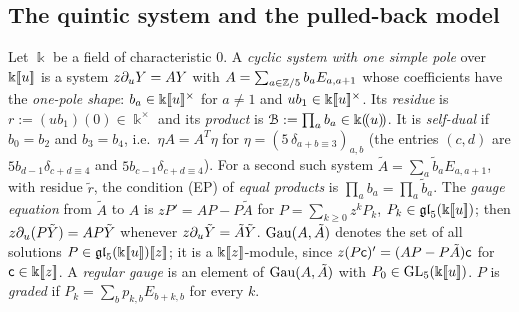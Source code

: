
\subsection{The quintic system and the pulled-back model}
\label{sec:gau-systems}

\begin{defn}
\label{def:gau-onepole}
Let $\Bbbk$ be a field of characteristic $0$. A \emph{cyclic system with one simple pole} over $\Bbbk[\![ u ]\!]$ is a system $z\partial_uY=AY$ with $A=\sum_{a\in\mathbb{Z}/5}b_aE_{a,a+1}$ whose coefficients have the \emph{one-pole shape}: $b_a\in\Bbbk[\![ u ]\!]^\times$ for $a\neq1$ and $ub_1\in\Bbbk[\![ u ]\!]^\times$. Its \emph{residue} is $r:=(ub_1)(0)\in\Bbbk^\times$ and its \emph{product} is $\mathcal{B}:=\prod_ab_a\in\Bbbk(\!(u)\!)$. It is \emph{self-dual} if $b_0=b_2$ and $b_3=b_4$, i.e.\ $\eta A=A^T\eta$ for $\eta=(5\,\delta_{a+b\equiv3})_{a,b}$ (the entries $(c,d)$ are $5b_{d-1}\delta_{c+d\equiv4}$ and $5b_{c-1}\delta_{c+d\equiv4}$). For a second such system $\tilde A=\sum_a\tilde b_aE_{a,a+1}$, with residue $\tilde r$, the condition (EP) of \emph{equal products} is $\prod_ab_a=\prod_a\tilde b_a$. The \emph{gauge equation} from $\tilde A$ to $A$ is $zP'=AP-P\tilde A$ for $P=\sum_{k\geq0}z^kP_k$, $P_k\in\mathfrak{gl}_5(\Bbbk[\![ u ]\!])$; then $z\partial_u(P\tilde Y)=AP\tilde Y$ whenever $z\partial_u\tilde Y=\tilde A\tilde Y$. $\operatorname{Gau}(A,\tilde A)$ denotes the set of all solutions $P\in\mathfrak{gl}_5(\Bbbk[\![ u ]\!])[\![ z ]\!]$; it is a $\Bbbk[\![ z ]\!]$-module, since $z(P\mathsf{c})'=(AP-P\tilde A)\mathsf{c}$ for $\mathsf{c}\in\Bbbk[\![ z ]\!]$. A \emph{regular gauge} is an element of $\operatorname{Gau}(A,\tilde A)$ with $P_0\in\mathrm{GL}_5(\Bbbk[\![ u ]\!])$. $P$ is \emph{graded} if $P_k=\sum_bp_{k,b}E_{b+k,b}$ for every $k$.
\end{defn}

